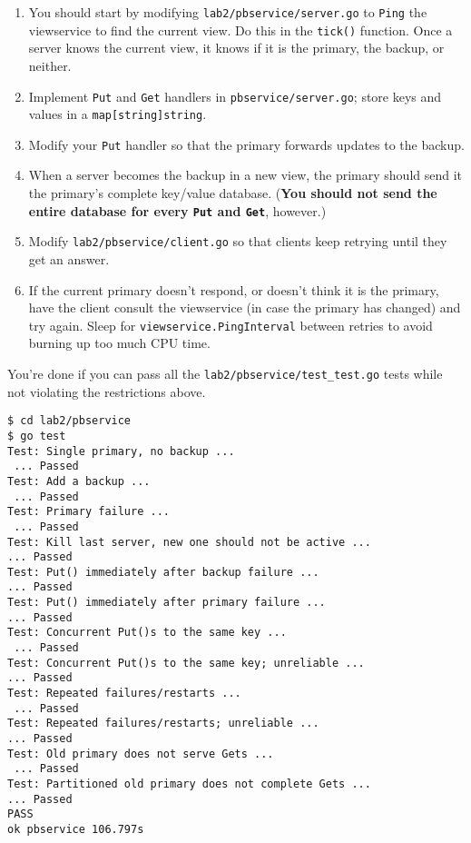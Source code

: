 \documentclass{article}
\newcommand{\code}{\texttt}
\begin{document}
\begin{enumerate}
    \item You should start by modifying \code{lab2/pbservice/server.go} to \code{Ping} the viewservice to find the current view. Do this in the \code{tick()} function. Once a server knows the current view, it knows if it is the primary, the backup, or neither. 
    \item Implement \code{Put} and \code{Get} handlers in \code{pbservice/server.go}; store keys and values in a \code{map[string]string}. 
    \item Modify your \code{Put} handler so that the primary forwards updates to the backup. 
    \item When a server becomes the backup in a new view, the primary should send it the primary's complete key/value database. (\textbf{You should not send the entire database for every \code{Put} and \code{Get}}, however.)
    \item Modify \code{lab2/pbservice/client.go} so that clients keep retrying until they get an answer.
    \item If the current primary doesn't respond, or doesn't think it is the primary, have the client consult the viewservice (in case the primary has changed) and try again. Sleep for \code{viewservice.PingInterval} between retries to avoid burning up too much CPU time. 
\end{enumerate}

You're done if you can pass all the \code{lab2/pbservice/test\_test.go} tests while not violating the restrictions above.
\begin{lstlisting}
$ cd lab2/pbservice 
$ go test 
Test: Single primary, no backup ... 
 ... Passed 
Test: Add a backup ... 
 ... Passed
Test: Primary failure ... 
 ... Passed 
Test: Kill last server, new one should not be active ...
... Passed 
Test: Put() immediately after backup failure ...
... Passed 
Test: Put() immediately after primary failure ...
... Passed 
Test: Concurrent Put()s to the same key ... 
 ... Passed 
Test: Concurrent Put()s to the same key; unreliable ...
... Passed 
Test: Repeated failures/restarts ... 
 ... Passed 
Test: Repeated failures/restarts; unreliable ...
... Passed 
Test: Old primary does not serve Gets ... 
 ... Passed 
Test: Partitioned old primary does not complete Gets ...
... Passed 
PASS 
ok pbservice 106.797s 
\end{lstlisting}
\end{document}
